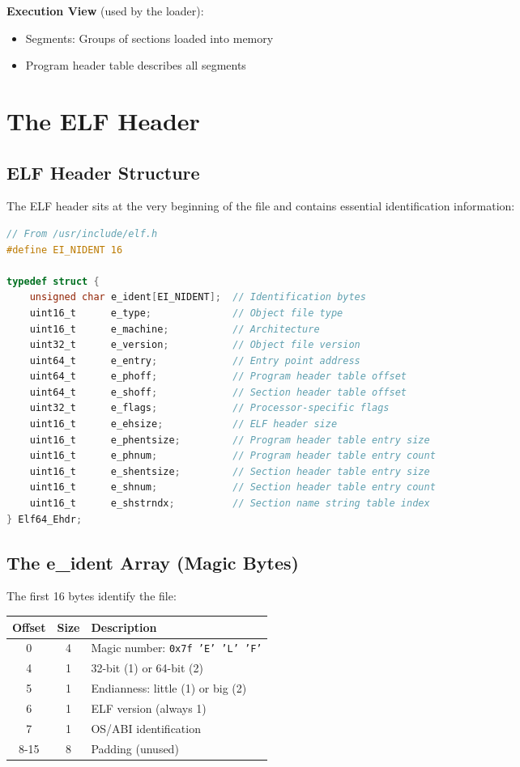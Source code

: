 \textbf{Execution View} (used by the loader):
\begin{itemize}
    \item Segments: Groups of sections loaded into memory
    \item Program header table describes all segments
\end{itemize}

\section{The ELF Header}

\subsection{ELF Header Structure}

The ELF header sits at the very beginning of the file and contains essential identification information:

\begin{lstlisting}[language=C]
// From /usr/include/elf.h
#define EI_NIDENT 16

typedef struct {
    unsigned char e_ident[EI_NIDENT];  // Identification bytes
    uint16_t      e_type;              // Object file type
    uint16_t      e_machine;           // Architecture
    uint32_t      e_version;           // Object file version
    uint64_t      e_entry;             // Entry point address
    uint64_t      e_phoff;             // Program header table offset
    uint64_t      e_shoff;             // Section header table offset
    uint32_t      e_flags;             // Processor-specific flags
    uint16_t      e_ehsize;            // ELF header size
    uint16_t      e_phentsize;         // Program header table entry size
    uint16_t      e_phnum;             // Program header table entry count
    uint16_t      e_shentsize;         // Section header table entry size
    uint16_t      e_shnum;             // Section header table entry count
    uint16_t      e_shstrndx;          // Section name string table index
} Elf64_Ehdr;
\end{lstlisting}

\subsection{The e\_ident Array (Magic Bytes)}

The first 16 bytes identify the file:

\begin{tabular}{|c|c|l|}
\hline
\textbf{Offset} & \textbf{Size} & \textbf{Description} \\
\hline
0 & 4 & Magic number: \texttt{0x7f 'E' 'L' 'F'} \\
\hline
4 & 1 & 32-bit (1) or 64-bit (2) \\
\hline
5 & 1 & Endianness: little (1) or big (2) \\
\hline
6 & 1 & ELF version (always 1) \\
\hline
7 & 1 & OS/ABI identification \\
\hline
8-15 & 8 & Padding (unused) \\
\hline
\end{tabular}

